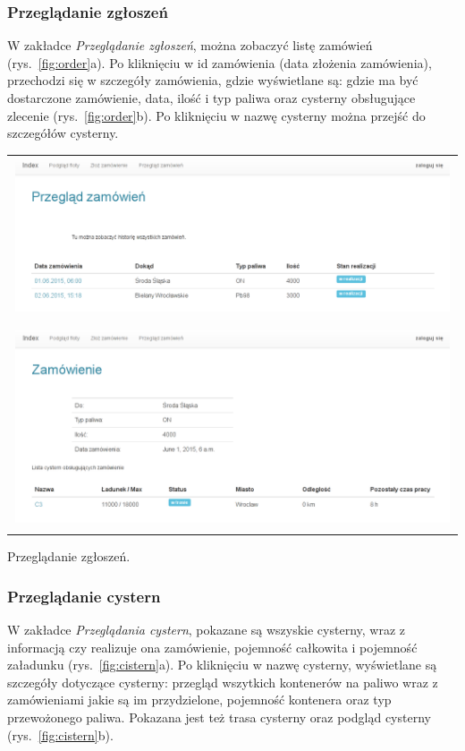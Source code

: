\documentclass[11pt,a4paper,oneside]{mwart}
\begin{document}
\subsubsection{Przeglądanie zgłoszeń}
W zakładce \emph{Przeglądanie zgłoszeń}, można zobaczyć listę zamówień (rys.~\ref{fig:order}a). Po kliknięciu w id zamówienia (data złożenia zamówienia), przechodzi się w szczegóły zamówienia, gdzie wyświetlane są: gdzie ma być dostarczone zamówienie, data, ilość i typ paliwa oraz cysterny obsługujące zlecenie (rys.~\ref{fig:order}b). Po kliknięciu w nazwę cysterny można przejść do szczegółów cysterny.
\begin{wykres}[htbp]
  \centering
  \begin{tabular}{c}
    \includegraphics[width=0.99\textwidth]{pics/order_list.png} \\
    \raisebox{1.5ex}{a) Przeglądanie zamówień.} \\
    \\
    \includegraphics[width=0.99\textwidth]{pics/order_detail.png} \\
  \raisebox{1.5ex}{b) Szczegóły zamówienia.}\\ 
\end{tabular}
  \caption{Przeglądanie zgłoszeń.}
  \label{fig:order}
\end{wykres}

\subsubsection{Przeglądanie cystern}
W zakładce \emph{Przeglądania cystern}, pokazane są wszyskie cysterny, wraz z informacją czy realizuje ona zamówienie, pojemność całkowita i pojemność załadunku (rys.~\ref{fig:cistern}a). Po kliknięciu w nazwę cysterny, wyświetlane są szczegóły dotyczące cysterny: przegląd wszytkich kontenerów na paliwo wraz z zamówieniami jakie są im przydzielone, pojemność kontenera oraz typ przewożonego paliwa. Pokazana jest też trasa cysterny oraz podgląd cysterny (rys.~\ref{fig:cistern}b).
\end{document}

